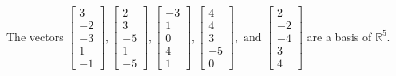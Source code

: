 \begin{exercise}
\begin{exerciseStatement}
  \end{exerciseStatement}
  \begin{exerciseAnswer}
   The vectors \(\left[\begin{array}{r}
3 \\
-2 \\
-3 \\
1 \\
-1
\end{array}\right] , \left[\begin{array}{r}
2 \\
3 \\
-5 \\
1 \\
-5
\end{array}\right] , \left[\begin{array}{r}
-3 \\
1 \\
0 \\
4 \\
1
\end{array}\right] , \left[\begin{array}{r}
4 \\
4 \\
3 \\
-5 \\
0
\end{array}\right] , \text{ and } \left[\begin{array}{r}
2 \\
-2 \\
-4 \\
3 \\
4
\end{array}\right]\) 
  	 are  a basis of \(\mathbb{R}^5\).
  


  \end{exerciseAnswer}
\end{exercise}